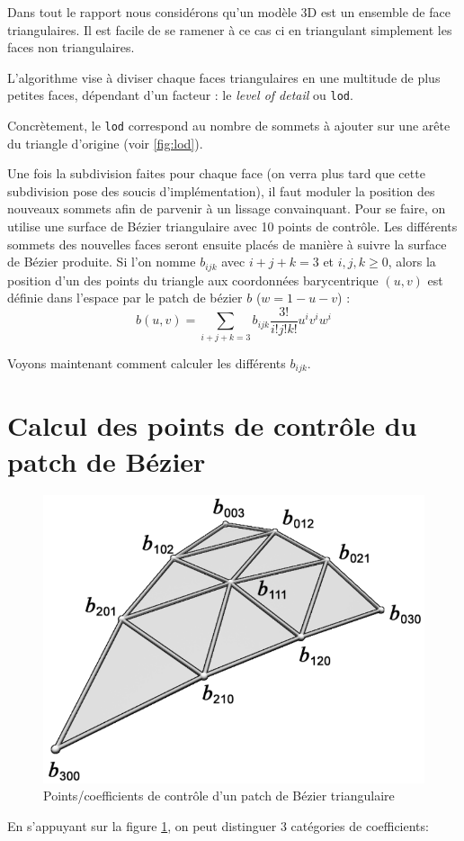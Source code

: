 \documentclass{article}
\begin{document}
Dans tout le rapport nous considérons qu'un modèle 3D est un ensemble de face
triangulaires. Il est facile de se ramener à ce cas ci en triangulant
simplement les faces non triangulaires.

L'algorithme vise à diviser chaque faces triangulaires en une multitude de plus
petites faces,
dépendant d'un facteur : le \textit{level of detail} ou \texttt{lod}.

Concrètement, le \texttt{lod} correspond au nombre de sommets à ajouter sur une
arête du triangle d'origine (voir \ref{fig:lod}).

Une fois la subdivision faites pour chaque face (on verra plus tard que cette
subdivision pose des soucis d'implémentation), il faut moduler la position des
nouveaux sommets afin de parvenir à un lissage convainquant. Pour se faire, on
utilise une surface de Bézier triangulaire avec 10 points de contrôle. Les
différents sommets des nouvelles faces seront ensuite placés de manière à
suivre la surface de Bézier produite. Si l'on nomme $b_{ijk}$ avec $i+j+k = 3$
et $i,j,k\geq 0$, alors la position d'un des points du triangle aux coordonnées
barycentrique $(u,v)$ est définie dans l'espace par le patch de bézier $b$
($w=1-u-v$) : $$b(u,v) = \sum_{i+j+k=3} b_{ijk} \frac{3!}{i!j!k!}u^i v^i w^i$$

Voyons maintenant comment calculer les différents $b_{ijk}$.

\section{Calcul des points de contrôle du patch de Bézier}

\begin{figure}[ht!]
\centering
    \includegraphics[width=0.4\linewidth]{control-points}
    \caption{Points/coefficients de contrôle d'un patch de Bézier triangulaire}
    \label{fig:control-points}
\end{figure}

En s'appuyant sur la figure \ref{fig:control-points}, on peut distinguer 3
catégories de coefficients:
\end{document}
